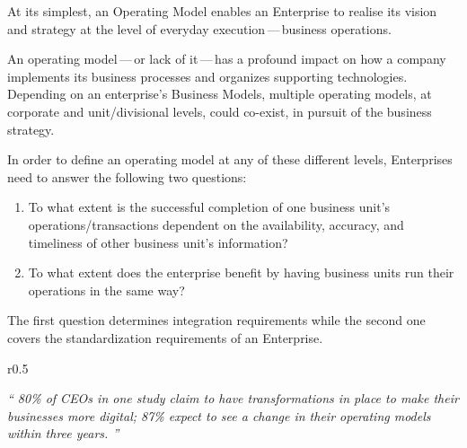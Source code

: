 %
%

At its simplest, an Operating Model enables an Enterprise to realise its vision and strategy
at the level of everyday execution\,---\,business operations.

An operating model\,---\,or lack of it\,---\,has a profound impact on how a company implements its
business processes and organizes supporting technologies.
Depending on an enterprise's Business Models, multiple operating models,
at corporate and unit/divisional levels, could co-exist, in pursuit of the business strategy.

In order to define an operating model at any of these different levels,
Enterprises need to answer the following two questions:

\begin{enumerate}
    \item To what extent is the successful completion of one business unit’s operations/transactions dependent on the
    availability, accuracy, and timeliness of other business unit’s information?
    \item To what extent does the enterprise benefit by having business units run their operations in the same way?
\end{enumerate}

The first question determines integration requirements while the second one covers the standardization requirements
of an Enterprise.

\begin{wrapfigure}[7]{r}{0.5\textwidth}
    \vspace{-23pt}
    \begin{center}
        \begin{tcolorbox}[colback=secondary!5,colframe=secondary!60,left=2pt,right=2pt]
            \itshape\large\enquote{%
                80\% of CEOs in one study claim to have transformations in place to make their businesses more digital;
                87\% expect to see a change in their operating models within three years.%
            }%
            \begin{flushright}\textcite{align_operating_model_to_strategy}\end{flushright}%
        \end{tcolorbox}
    \end{center}
\end{wrapfigure}

